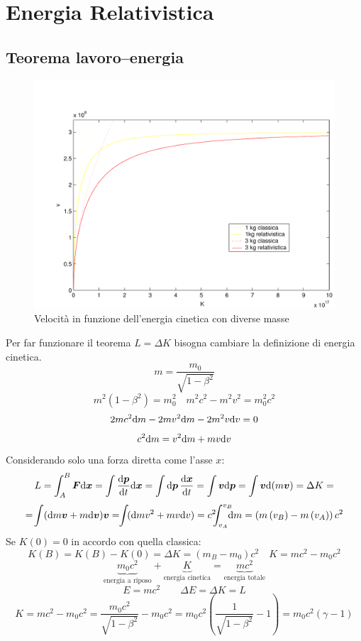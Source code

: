 \section{Energia Relativistica}
\label{energia_cinetica_relativistica}
\subsection{Teorema lavoro--energia}
\begin{figure}[htbp]
   \centering
   \includegraphics[scale=0.6]{immagini/fisica1/V_K}
   \caption{Velocità in funzione dell'energia cinetica con diverse masse}
\end{figure}
Per far funzionare il teorema $L=\Delta K$ bisogna cambiare la definizione di energia cinetica.
$$m=\frac{m_0}{\sqrt{1-\beta^2}}$$
$$m^2(1-\beta^2)=m_0^2\quad m^2c^2-m^2v^2=m_0^2c^2$$
$$2mc^2\mathrm{d} m-2mv^2\mathrm{d} m-2m^2v\mathrm{d} v=0$$
$$c^2\mathrm{d} m=v^2\mathrm{d} m+mv\mathrm{d} v$$
Considerando solo una forza diretta come l'asse $x$:
$$L=\int_A^B \boldsymbol{F}\mathrm{d} \boldsymbol{x}=\int\frac{\mathrm{d} \boldsymbol{p}}{\mathrm{d} t}\mathrm{d} \boldsymbol{x}=\int\mathrm{d} \boldsymbol{p}\,\frac{\mathrm{d}\boldsymbol{x}}{\mathrm{d} t}=\int \boldsymbol{v}\mathrm{d} \boldsymbol{p}=\int \boldsymbol{v}\mathrm{d}(m\boldsymbol{v})=\Delta K=$$
$$=\!\int(\ud m\ve v+m\ud\ve v)\ve v=\!\!\int\!(\ud mv^2+mv\ud v)=c^2\!\!\!\int_{v_A}^{v_B}\!\!\!\!\ud m=\left(m\left(v_B\right)-m\left(v_A\right)\right)c^2$$
Se $K(0)=0$ in accordo con quella classica:
$$K(B)=K(B)-K(0)=\Delta K=(m_B-m_0)c^2\quad K=mc^2-m_0c^2$$
$$\underbrace{m_0c^2}_{\text{energia a riposo}}+\underbrace{K}_{\text{energia cinetica}}=\underbrace{mc^2}_{\text{energia totale}}$$
$$E=mc^2\qquad \Delta E=\Delta K=L$$
$$K=mc^2-m_0c^2=\frac{m_0c^2}{\sqrt{1-\beta^2}}-m_0c^2=m_0c^2\left(\frac{1}{\sqrt{1-\beta^2}}-1\right)=m_0c^2\left(\gamma-1\right)$$
